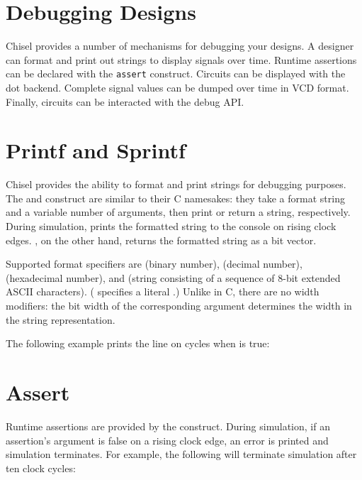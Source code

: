 \section{Debugging Designs}

Chisel provides a number of mechanisms for debugging your designs.  
A designer can format and print out strings to display signals over time.
Runtime assertions can be declared with the \verb+assert+ construct.
Circuits can be displayed with the dot backend.
Complete signal values can be dumped over time in VCD format.
Finally, circuits can be interacted with the debug API.

\section{Printf and Sprintf}

Chisel provides the ability to format and print strings for debugging
purposes.  The  and  construct are similar to their
C namesakes: they take a format string and a variable number of arguments,
then print or return a string, respectively.  During simulation, 
prints the formatted string to the console on rising clock edges.
, on the other hand, returns the formatted string as a bit
vector.

Supported format specifiers are  (binary number), 
(decimal number),  (hexadecimal number), and  (string
consisting of a sequence of 8-bit extended ASCII characters).  (\code{\%\%}
specifies a literal \code{\%}.) Unlike in C, there are no width modifiers: the
bit width of the corresponding argument determines the width in the string
representation.

The following example prints the line  on cycles when
 is true:


\section{Assert}

Runtime assertions are provided by the  construct.  During
simulation, if an assertion's argument is false on a rising clock edge,
an error is printed and simulation terminates.  For example, the following
will terminate simulation after ten clock cycles:

